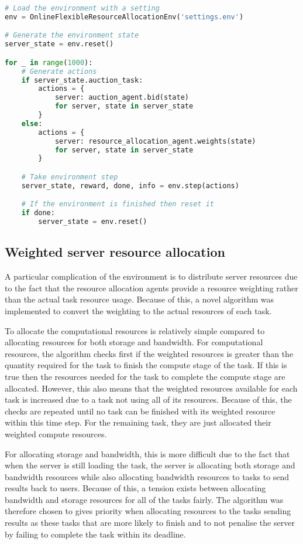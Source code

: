 \begin{lstlisting}[language=Python, frame=single, caption={Example code for running the environment}, captionpos=b,
                   label={lst:example_flexible_resource_env}]
# Load the environment with a setting
env = OnlineFlexibleResourceAllocationEnv('settings.env')

# Generate the environment state
server_state = env.reset()

for _ in range(1000):
    # Generate actions
    if server_state.auction_task:
        actions = {
            server: auction_agent.bid(state)
            for server, state in server_state
        }
    else:
        actions = {
            server: resource_allocation_agent.weights(state)
            for server, state in server_state
        }

    # Take environment step
    server_state, reward, done, info = env.step(actions)

    # If the environment is finished then reset it
    if done:
        server_state = env.reset()
\end{lstlisting}

\subsection{Weighted server resource allocation}\label{subsec:weighted-server-resource-allocation}
A particular complication of the environment is to distribute server resources due to the fact that the resource
allocation agents provide a resource weighting rather than the actual task resource usage. Because of this, a novel
algorithm was implemented to convert the weighting to the actual resources of each task.

To allocate the computational resources is relatively simple compared to allocating resources for both storage and
bandwidth. For computational resources, the algorithm checks first if the weighted resources is greater than the
quantity required for the task to finish the compute stage of the task. If this is true then the resources needed for the
task to complete the compute stage are allocated. However, this also means that the weighted resources available for each
task is increased due to a task not using all of its resources. Because of this, the checks are repeated until no task
can be finished with its weighted resource within this time step. For the remaining task, they are just allocated their
weighted compute resources.

For allocating storage and bandwidth, this is more difficult due to the fact that when the server is still
loading the task, the server is allocating both storage and bandwidth resources while also allocating bandwidth
resources to tasks to send results back to users. Because of this, a tension exists between allocating bandwidth and
storage resources for all of the tasks fairly. The algorithm was therefore chosen to gives priority when allocating
resources to the tasks sending results as these tasks that are more likely to finish and to not penalise the
server by failing to complete the task within its deadline.

